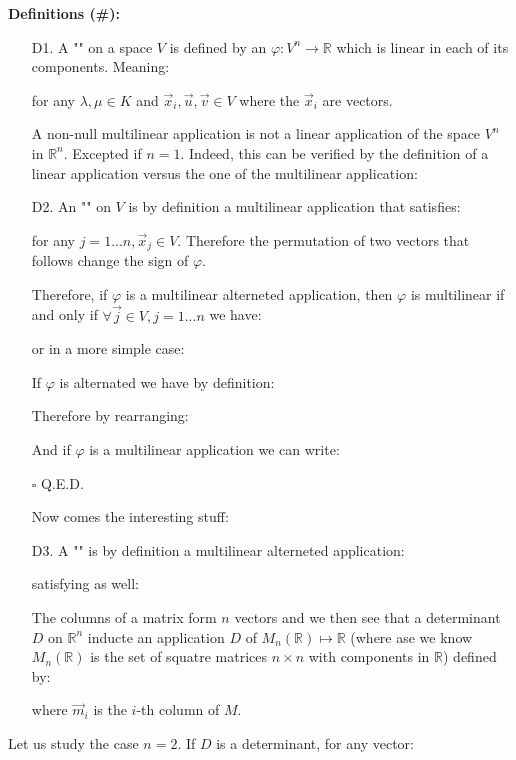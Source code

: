	\textbf{Definitions (\#\mydef):}
	\begin{enumerate}
		\item[D1.] A "" on a space $V$ is defined by an $\varphi: V^n \rightarrow \mathbb{R}$ which is linear in each of its components. Meaning:
		
		for any $\lambda,\mu\in K$ and $\vec{x}_i,\vec{u},\vec{v}\in V$ where the $\vec{x}_i$ are vectors.
		\begin{tcolorbox}[title=Remark,colframe=black,arc=10pt]
		A non-null multilinear application is not a linear application of the space $V^n$ in $\mathbb{R}^n$. Excepted if $n=1$. Indeed, this can be verified by the definition of a linear application  versus the one of the multilinear application:
		
		\end{tcolorbox}
		\item[D2.] An "" on $V$ is by definition a multilinear application that satisfies:
		
		for any $j=1...n,\vec{x}_j\in V$. Therefore the permutation of two vectors that follows change the sign of $\varphi$.
		\begin{theorem}
		Therefore, if $\varphi$ is a multilinear alterneted application, then $\varphi$ is multilinear if and only if $\forall \vec{j}\in V,j=1...n$ we have:
		
		or in a more simple case:
		
		\end{theorem}
		\begin{dem}
		If $\varphi$ is alternated we have by definition:
		
		Therefore by rearranging:
		
		And if $\varphi$ is a multilinear application we can write:
		
		\begin{flushright}
			$\square$  Q.E.D.
		\end{flushright}
		\end{dem}
		Now comes the interesting stuff:
		
		\item[D3.]  A "" is by definition a multilinear alterneted application:
		
		satisfying as well:
		
		\begin{tcolorbox}[title=Remark,colframe=black,arc=10pt]
		The columns of a matrix form $n$ vectors and we then see that a determinant $D$ on $\mathbb{R}^n$ inducte an application $D$ of $M_n(\mathbb{R})\mapsto \mathbb{R}$ (where ase we know $M_n(\mathbb{R})$ is the set of squatre matrices $n\times n$ with components in $\mathbb{R}$) defined by:
		
		where $\vec{m}_i$ is the $i$-th column of $M$. 
		\end{tcolorbox}	
	\end{enumerate}
	Let us study the case $n=2$. If $D$ is a determinant, for any vector:
	
